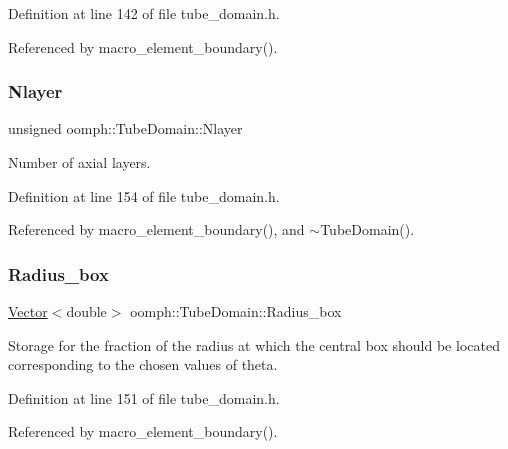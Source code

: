 Definition at line 142 of file tube\+\_\+domain.\+h.



Referenced by macro\+\_\+element\+\_\+boundary().

\mbox{\label{classoomph_1_1TubeDomain_a76d77b0dde9979a92e88d3d0143bf114}} 
\subsubsection{\texorpdfstring{Nlayer}{Nlayer}}
{\footnotesize\ttfamily unsigned oomph\+::\+Tube\+Domain\+::\+Nlayer\hspace{0.3cm}{\ttfamily [private]}}



Number of axial layers. 



Definition at line 154 of file tube\+\_\+domain.\+h.



Referenced by macro\+\_\+element\+\_\+boundary(), and $\sim$\+Tube\+Domain().

\mbox{\label{classoomph_1_1TubeDomain_ad70a97648fd496d9f5322e122ef907e4}} 
\subsubsection{\texorpdfstring{Radius\+\_\+box}{Radius\_box}}
{\footnotesize\ttfamily \hyperlink{classoomph_1_1Vector}{Vector}$<$double$>$ oomph\+::\+Tube\+Domain\+::\+Radius\+\_\+box\hspace{0.3cm}{\ttfamily [private]}}

Storage for the fraction of the radius at which the central box should be located corresponding to the chosen values of theta. 

Definition at line 151 of file tube\+\_\+domain.\+h.



Referenced by macro\+\_\+element\+\_\+boundary().

\mbox{\label{classoomph_1_1TubeDomain_a893b7c0f20f3971948bf4ab04d3fe182}} 

